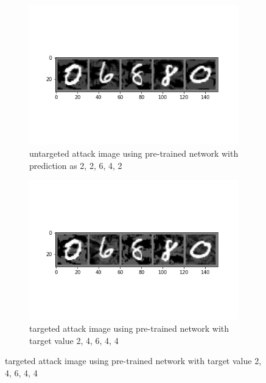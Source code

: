 \documentclass{article}
\begin{document}
\begin{enumerate}
     	\begin{figure}[H]
     	\centering
     	\begin{subfigure}[b]{0.45\textwidth}
         	\centering
         	\includegraphics[width=\textwidth]
         	{image/pre_batch_untarget_new_image.png}
         	\caption{untargeted attack image using pre-trained network with prediction as 2, 2, 6, 4, 2}
         	\label{fig:Hyperplane Epoch 0}
     	\end{subfigure}
     	\hfill
     	\begin{subfigure}[b]{0.45\textwidth}
         	\centering
         	\includegraphics[width=\textwidth]
         	{image/pre_batch_target_new_image.png}
         	\caption{targeted attack image using pre-trained network with target value 2, 4, 6, 4, 4}
         	\label{fig:Hyperplane Epoch 1000}
     	\end{subfigure}
     	\end{figure}
     	

\end{enumerate}
\end{document}
